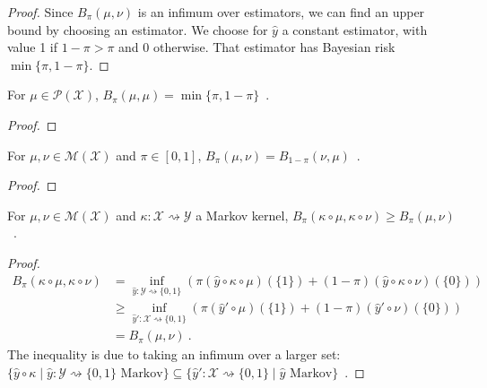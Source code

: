 \begin{proof}%
{}
Since $B_\pi(\mu, \nu)$ is an infimum over estimators, we can find an upper bound by choosing an estimator. We choose for $\hat{y}$ a constant estimator, with value 1 if $1- \pi > \pi$ and 0 otherwise.
That estimator has Bayesian risk $\min\{\pi, 1 - \pi\}$.
\end{proof}

\begin{lemma}
  \label{lem:bayesBinaryRisk_self}
  For $\mu \in \mathcal P(\mathcal X)$, $B_\pi(\mu, \mu) = \min\{\pi, 1-\pi\}$~.
\end{lemma}

\begin{proof}%
\uses{}
\end{proof}

\begin{lemma}
  \label{lem:bayesBinaryRisk_symm}
  For $\mu, \nu \in \mathcal M(\mathcal X)$ and $\pi \in [0,1]$, $B_\pi(\mu, \nu) = B_{1 - \pi}(\nu, \mu)$~.
\end{lemma}

\begin{proof}%
\uses{}

\end{proof}

\begin{theorem}
  \label{thm:data_proc_bayesBinaryRisk}
  For $\mu, \nu \in \mathcal M(\mathcal X)$ and $\kappa : \mathcal X \rightsquigarrow \mathcal Y$ a Markov kernel, $B_\pi(\kappa \circ \mu, \kappa \circ \nu) \ge B_\pi(\mu, \nu)$~.
\end{theorem}

\begin{proof}%
\uses{}
\begin{align*}
B_\pi(\kappa \circ \mu, \kappa \circ \nu)
&= \inf_{\hat{y} : \mathcal Y \rightsquigarrow \{0,1\}}\left(\pi (\hat{y} \circ \kappa \circ \mu)(\{1\}) + (1 - \pi) (\hat{y} \circ \kappa \circ \nu)(\{0\})\right)
\\
&\ge \inf_{\hat{y}' : \mathcal X \rightsquigarrow \{0,1\}}\left(\pi (\hat{y}' \circ \mu)(\{1\}) + (1 - \pi) (\hat{y}' \circ \nu)(\{0\})\right)
\\
&= B_\pi(\mu, \nu)
\: .
\end{align*}
The inequality is due to taking an infimum over a larger set: $\{\hat{y} \circ \kappa \mid \hat{y} : \mathcal Y \rightsquigarrow \{0,1\} \text{ Markov}\} \subseteq \{\hat{y}' : \mathcal X \rightsquigarrow \{0,1\} \mid \hat{y} \text{ Markov}\}$~.
\end{proof}

